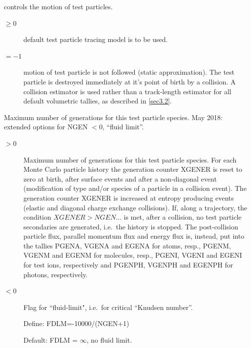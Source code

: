 \begin{description}
\begin{description}
        \end{description}
  \item[NFOL\$] controls the motion of test particles.
        \begin{description}
          \item[$\ge 0$] default test particle tracing model is to be used.
          \item[$= -1$] motion of test particle is not followed (static approximation).
                The test particle is destroyed immediately at it's point of birth by a
                collision.
                A collision estimator is used rather than a track-length estimator for all
                default volumetric tallies, as described in \cref{sec3.2}.
        \end{description}

  \item[NGEN\$] Maximum number of generations for this test particle species.
        May 2018: extended options for NGEN $<$0, ``fluid limit''.
        \begin{description}
          \item[$> 0$] Maximum number of generations for this test particle species.
                For each Monte Carlo particle history the generation counter XGENER is reset to
                zero at birth, after surface events and after a non-diagonal event
                (modification of type and/or species of a particle in a collision event).
                The generation counter XGENER is increased at entropy producing events (elastic
                and diagonal charge exchange collisions).
                If, along a trajectory, the condition $XGENER > NGEN\dots$ is met, after a
                collision, no test particle secondaries are generated, i.e.\ the history is
                stopped.
                The post-collision particle flux, parallel momentum flux and energy flux is,
                instead, put into the tallies PGENA, VGENA and EGENA for atoms, resp.,
                PGENM, VGENM and EGENM for molecules, resp.,  PGENI, VGENI and EGENI for test
                ions, respectively and PGENPH, VGENPH and EGENPH for photons, respectively.
          \item[$< 0$] Flag for  ``fluid-limit", i.e.\ for critical ``Knudsen number''.

                Define: FDLM=-10000/(NGEN+1)

                Default: FDLM = $\infty$, no fluid limit.


\end{description}
\end{description}
